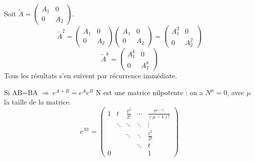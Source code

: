 \Lem{}{\[e^{\tilde{A}}=\begin{pmatrix}e^{D_1} & & & & & 0 \\ & \ddots & & & & \\ & & e^{D_L} & & & \\ & & & e^{J_1} & & \\ & & & & \ddots & \\ 0& & & & & e^{J_k}\end{pmatrix}\]}
\begin{dem}
Soit $\tilde{A}=\begin{pmatrix} A_1 & 0 \\ 0 & A_2 \end{pmatrix}$.
\[\tilde{A}^2=\begin{pmatrix}A_1&0\\0&A_2 \end{pmatrix}\begin{pmatrix}A_1&0\\0&A_2\end{pmatrix}=\begin{pmatrix}A_1^2&0\\0&A_2^2\end{pmatrix}\]
\[\tilde{A}^k=\begin{pmatrix}A_1^k&0\\0&A_2^k\end{pmatrix}\]
	Tous les résultats s'en suivent par récurrence immédiate.
\end{dem}

\bigskip
{}
\begin{dem}
	Si AB=BA $\Rightarrow\ e^{A+B}=e^Ae^B$
	N est une matrice nilpotente : on a $N^{\mu}=0$, avec $\mu$ la taille de la matrice.
	\[e^{Nt}=\begin{pmatrix}1 &    t   & \frac{t^2}{2!}  & \cdots & \frac{t^{\mu-1}}{(\mu-1)!} \\
				  & \ddots & \ddots & \ddots & \vdots           \\ 
				  &        & \ddots & \ddots & \frac{t^2}{2!}        \\
      				  &        &        & \ddots &       t               \\
				0 &        &        &        &       1               
	\end{pmatrix}\]
\end{dem}

